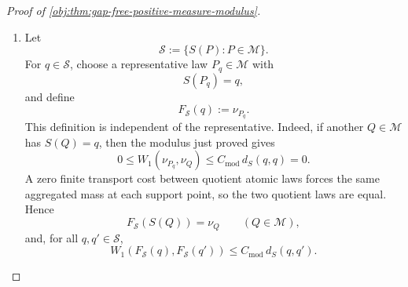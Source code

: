 \begin{proof}[Proof of \cref{obj:thm:gap-free-positive-measure-modulus}]
\begin{enumerate}
\[\begin{cases}
0,
&\zeta_P=\zeta_Q,\\[2mm]
\dfrac{\varphi(\zeta_P)-\varphi(\zeta_Q)}{\zeta_P-\zeta_Q}\,
\mathsf{Proj}_P(\zeta_P)(\mathfrak D_P-\mathfrak D_Q)\mathsf{Proj}_Q(\zeta_Q),
&\zeta_P\ne\zeta_Q .
\end{cases}
\]
The equal-spectral-value branch is zero by the preceding vanishing identity.  In the unequal branch, the one-Lipschitz property gives
\[
\left|
\frac{\varphi(\zeta_P)-\varphi(\zeta_Q)}{\zeta_P-\zeta_Q}
\right|\le1,
\]
and therefore
\[
\|\Xi(\zeta_P,\zeta_Q)\|_{\mathrm{op}}
\le
\kappa_\star^2\|\mathfrak D_P-\mathfrak D_Q\|_{\mathrm{op}}.
\]
Because \(|\Omega_P|\le d_x\) and \(|\Omega_Q|\le d_x\), the triangle inequality gives
\[
\|\varphi(\mathfrak D_P)-\varphi(\mathfrak D_Q)\|_{\mathrm{op}}
\le
d_x^2\kappa_\star^2
\|\mathfrak D_P-\mathfrak D_Q\|_{\mathrm{op}}.
\]
Also,
\[
\|\varphi(\mathfrak D_P)\|_{\mathrm{op}}
\le \kappa_\star L_\tau,
\]
because \(\varphi(0)=0\), \(\varphi\) is one-Lipschitz, and every eigenvalue of \(\mathfrak D_P\) lies in \([-L_\tau,L_\tau]\).

Using the representation identity for \(P\) and \(Q\),
\[
\begin{aligned}
W_1(\nu_P,\nu_Q)
&\le
\|m_X(P)-m_X(Q)\|_2\,\|\varphi(\mathfrak D_P)\|_{\mathrm{op}}\|e_1\|_2\\
&\quad+
\|m_X(Q)\|_2\,
\|\varphi(\mathfrak D_P)-\varphi(\mathfrak D_Q)\|_{\mathrm{op}}\|e_1\|_2\\
&\le
C_{\mathrm{base}}\,d_S(S(P),S(Q))
\le
C_{\mathrm{mod}}\,d_S(S(P),S(Q)).
\end{aligned}
\]
This proves the asserted modulus on model summaries:
\begin{equation}
W_1(\nu_P,\nu_Q)
\le C_{\mathrm{mod}}d_S(S(P),S(Q)).
\label{eq:gap-free-model-summary-control}
\end{equation}

\item Let
\[
\mathscr S:=\{S(P):P\in\mathcal M\}.
\]
For \(q\in\mathscr S\), choose a representative law \(P_q\in\mathcal M\) with
\[
S(P_q)=q,
\]
and define
\[
F_{\mathscr S}(q):=\nu_{P_q}.
\]
This definition is independent of the representative.  Indeed, if another \(Q\in\mathcal M\) has \(S(Q)=q\), then the modulus just proved gives
\[
0\le W_1(\nu_{P_q},\nu_Q)
\le C_{\mathrm{mod}}\,d_S(q,q)=0.
\]
A zero finite transport cost between quotient atomic laws forces the same aggregated mass at each support point, so the two quotient laws are equal.  Hence
\[
F_{\mathscr S}(S(Q))=\nu_Q
\qquad(Q\in\mathcal M),
\]
and, for all \(q,q'\in\mathscr S\),
\[
W_1(F_{\mathscr S}(q),F_{\mathscr S}(q'))
\le
C_{\mathrm{mod}}\,d_S(q,q').
\]


\end{enumerate}
\end{proof}
